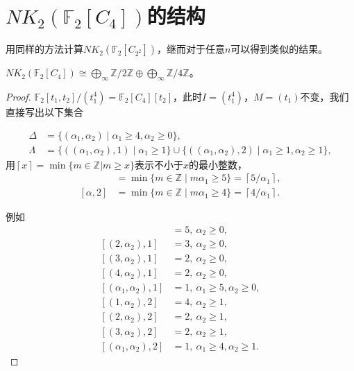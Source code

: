 











\section{$NK_2(\mathbb{F}_2[C_4])$的结构}
用同样的方法计算$NK_2(\mathbb{F}_2[C_{2^2}])$，继而对于任意$n$可以得到类似的结果。

\begin{theorem}
	$NK_2(\mathbb{F}_2[C_4])\cong \bigoplus_{\infty} \mathbb{Z}/2 \mathbb{Z}\oplus \bigoplus_{\infty}\mathbb{Z}/4 \mathbb{Z}$。
\end{theorem}
\begin{proof}
	$\mathbb{F}_2[t_1,t_2]/(t_1^4)=\mathbb{F}_2[C_{4}][t_2]$，此时$I=(t_1^4)$，$M=(t_1)$不变，我们直接写出以下集合

\begin{align*}
\Delta &=\{(\alpha_1,\alpha_2)\mid \alpha_1\geq 4, \alpha_2 \geq 0\},\\
\Lambda &=\{((\alpha_1,\alpha_2),1) \mid \alpha_1\geq 1\}\cup \{((\alpha_1,\alpha_2),2) \mid \alpha_1\geq 1, \alpha_2\geq 1\},
\end{align*}
用$\left \lceil x \right \rceil=\min \{m\in \mathbb{Z}|m\geq x\}$表示不小于$x$的最小整数，
\begin{align*}
[\alpha,1] & =\min \{m\in \mathbb{Z} \mid m \alpha_1\geq 5\}=\left \lceil 5/\alpha_1 \right \rceil,\\
[\alpha,2] & =\min \{m\in \mathbb{Z} \mid m \alpha_1\geq 4\}=\left \lceil 4/\alpha_1 \right \rceil.
\end{align*}

例如
\begin{align*}
[(1,\alpha_2),1] & = 5, \ \alpha_2\geq 0, \\
[(2,\alpha_2),1] & = 3, \ \alpha_2\geq 0, \\
[(3,\alpha_2),1] & = 2, \ \alpha_2\geq 0, \\
[(4,\alpha_2),1] & = 2, \ \alpha_2\geq 0, \\
[(\alpha_1,\alpha_2),1] & = 1, \ \alpha_1\geq 5, \alpha_2\geq 0, \\
[(1,\alpha_2),2] & = 4, \ \alpha_2\geq 1, \\
[(2,\alpha_2),2] & = 2, \ \alpha_2\geq 1, \\
[(3,\alpha_2),2] & = 2, \ \alpha_2\geq 1, \\
[(\alpha_1,\alpha_2),2] & = 1, \ \alpha_1\geq 4, \alpha_2\geq 1.
\end{align*}



\end{proof}

